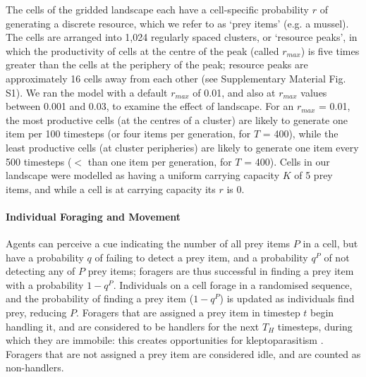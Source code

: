     The cells of the gridded landscape each have a cell-specific probability $r$ of generating a discrete resource, which we refer to as `prey items' (e.g. a mussel).
    The cells are arranged into 1,024 regularly spaced clusters, or `resource peaks', in which the productivity of cells at the centre of the peak (called $r_{max}$) is five times greater than the cells at the periphery of the peak; resource peaks are approximately 16 cells away from each other (see {\color{red}Supplementary Material Fig. S1}).
    We ran the model with a default $r_{max}$ of 0.01, and also at $r_{max}$ values between 0.001 and 0.03, to examine the effect of landscape.
    For an $r_{max}$ = 0.01, the most productive cells (at the centres of a cluster) are likely to generate one item per 100 timesteps (or four items per generation, for $T$ = 400), while the least productive cells (at cluster peripheries) are likely to generate one item every 500 timesteps ($<$ than one item per generation, for $T$ = 400).
    Cells in our landscape were modelled as having a uniform carrying capacity $K$ of 5 prey items, and while a cell is at carrying capacity its $r$ is 0.
    
    \paragraph*{Individual Foraging and Movement}
    
    Agents can perceive a cue indicating the number of all prey items $P$ in a cell, but have a probability $q$ of failing to detect a prey item, and a probability $q^P$ of not detecting any of $P$ prey items; foragers are thus successful in finding a prey item with a probability $1 - q^P$.
    Individuals on a cell forage in a randomised sequence, and the probability of finding a prey item ($1 - q^P$) is updated as individuals find prey, reducing $P$.
    Foragers that are assigned a prey item in timestep $t$ begin handling it, and are considered to be handlers for the next $T_H$ timesteps, during which they are immobile: this creates opportunities for kleptoparasitism \citep{holmgren1995}.
    Foragers that are not assigned a prey item are considered idle, and are counted as non-handlers.
    
